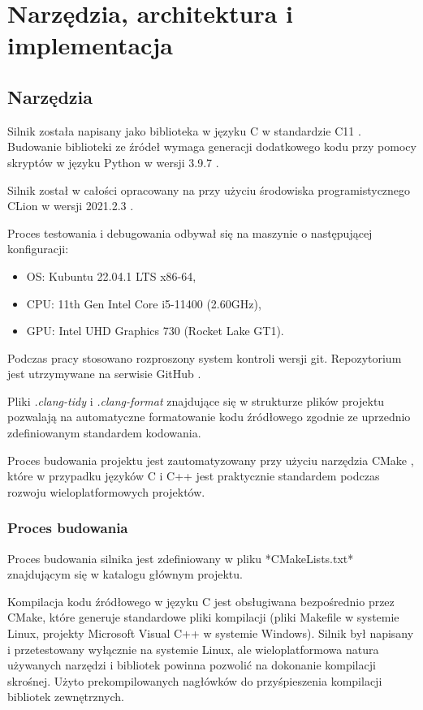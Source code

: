 \chapter{Narzędzia, architektura i implementacja}
\label{chap:algs}

\section{Narzędzia}

Silnik została napisany jako biblioteka w języku C w standardzie C11 \cite{C11REFERENCE}. Budowanie biblioteki ze źródeł wymaga generacji
dodatkowego kodu przy pomocy skryptów w języku Python w wersji 3.9.7 \cite{PYTHONREFERENCE}.

Silnik został w całości opracowany na przy użyciu środowiska programistycznego CLion w wersji 2021.2.3 \cite{CLION}.

Proces testowania i debugowania odbywał się na maszynie o następującej konfiguracji:
\begin{itemize}
	\item {OS}: Kubuntu 22.04.1 LTS x86-64,
	\item {CPU}: 11th Gen Intel Core i5-11400 (2.60GHz),
	\item {GPU}: Intel UHD Graphics 730 (Rocket Lake GT1).
\end{itemize}

Podczas pracy stosowano rozproszony system kontroli wersji git. Repozytorium jest utrzymywane na serwisie GitHub \cite{GITHUB}.

Pliki \textit{.clang-tidy} i \textit{.clang-format} znajdujące się w strukturze plików projektu pozwalają na automatyczne formatowanie kodu źródłowego zgodnie ze uprzednio zdefiniowanym standardem kodowania.

Proces budowania projektu jest zautomatyzowany przy użyciu narzędzia CMake \cite{CMAKE}, które w przypadku języków C i C++ jest praktycznie standardem podczas rozwoju wieloplatformowych projektów.

\subsection{Proces budowania}

Proces budowania silnika jest zdefiniowany w pliku *CMakeLists.txt* znajdującym się w katalogu głównym projektu.

Kompilacja kodu źródłowego w języku C jest obsługiwana bezpośrednio przez CMake, które generuje standardowe pliki
kompilacji (pliki Makefile w systemie Linux, projekty Microsoft Visual C++ w systemie Windows).
Silnik był napisany i przetestowany wyłącznie na systemie Linux, ale wieloplatformowa natura używanych narzędzi i bibliotek powinna pozwolić na dokonanie kompilacji skrośnej.
Użyto prekompilowanych nagłówków do przyśpieszenia kompilacji bibliotek zewnętrznych.

